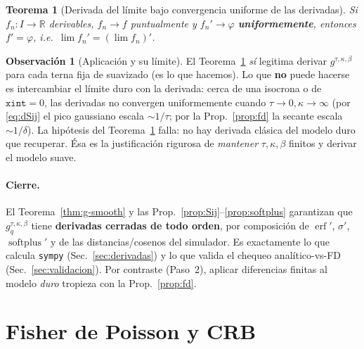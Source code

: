 \documentclass[11pt,a4paper]{article}
\theoremstyle{plain}
\newtheorem{theorem}{Teorema}
\theoremstyle{definition}
\newtheorem{remark}{Observaci\'on}
\newcommand{\R}{\mathbb{R}}
\newcommand{\softplus}{\operatorname{softplus}}
\newcommand{\erf}{\operatorname{erf}}
\begin{document}
\begin{theorem}[Derivada del l\'imite bajo convergencia uniforme de las derivadas]\label{thm:uniforme}
Si $f_n:I\to\R$ derivables, $f_n\to f$ puntualmente y $f_n'\to\varphi$
\textbf{uniformemente}, entonces $f'=\varphi$, i.e.\ $\lim f_n'=(\lim f_n)'$.
\end{theorem}

\begin{remark}[Aplicaci\'on y su l\'imite]
El Teorema~\ref{thm:uniforme} \emph{s\'i} legitima derivar
$g^{\tau,\kappa,\beta}$ para cada terna fija de suavizado (es lo que hacemos). Lo
que \textbf{no} puede hacerse es intercambiar el l\'imite duro con la derivada:
cerca de una isocrona o de $\texttt{xint}=0$, las derivadas no convergen
uniformemente cuando $\tau\to0,\kappa\to\infty$ (por \eqref{eq:dSij} el pico
gaussiano escala $\sim1/\tau$; por la Prop.~\ref{prop:fd} la secante escala
$\sim1/\delta$). La hip\'otesis del Teorema~\ref{thm:uniforme} falla: no hay
derivada cl\'asica del modelo duro que recuperar. \'Esa es la justificaci\'on
rigurosa de \emph{mantener} $\tau,\kappa,\beta$ finitos y derivar el modelo suave.
\end{remark}

\paragraph{Cierre.} El Teorema~\ref{thm:g-smooth} y las
Prop.~\ref{prop:Sij}--\ref{prop:softplus} garantizan que
$g^{\tau,\kappa,\beta}_q$ tiene \textbf{derivadas cerradas de todo orden}, por
composici\'on de $\erf'$, $\sigma'$, $\softplus'$ y de las distancias/cosenos del
simulador. Es exactamente lo que calcula \texttt{sympy}
(Sec.~\ref{sec:derivadas}) y lo que valida el chequeo anal\'itico-vs-FD
(Sec.~\ref{sec:validacion}). Por contraste (Paso~2), aplicar diferencias finitas
al modelo \emph{duro} tropieza con la Prop.~\ref{prop:fd}.

\section{Fisher de Poisson y CRB}
\label{sec:fisher}
\end{document}
